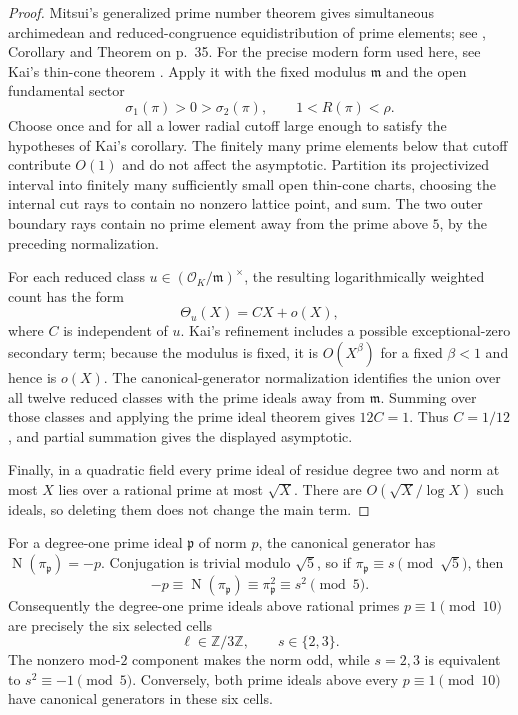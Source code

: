 \documentclass[12pt]{amsart}
\theoremstyle{definition}
\theoremstyle{remark}
\DeclareMathOperator{\N}{N}
\newcommand{\ZZ}{\mathbb{Z}}
\newcommand{\OK}{\mathcal{O}_K}
\begin{document}
\begin{proof}
Mitsui's generalized prime number theorem gives simultaneous
archimedean and reduced-congruence equidistribution of prime elements;
see \cite{jMi56}, Corollary and Theorem on p.~35.  For the precise
modern form used here, see Kai's thin-cone theorem
\cite[Corollary~4.2.3]{oKai22}.  Apply it with the fixed modulus
$\mathfrak m$ and the open fundamental sector
\[
  \sigma_1(\pi)>0>\sigma_2(\pi),
  \qquad 1<R(\pi)<\rho.
\]
Choose once and for all a lower radial cutoff large enough to satisfy
the hypotheses of Kai's corollary.  The finitely many prime elements
below that cutoff contribute $O(1)$ and do not affect the asymptotic.
Partition its projectivized interval into finitely many sufficiently
small open thin-cone charts, choosing the internal cut rays to contain
no nonzero lattice point, and sum.  The two outer boundary rays contain
no prime element away from the prime above $5$, by the preceding
normalization.

For each reduced class $u\in(\OK/\mathfrak m)^\times$, the resulting
logarithmically weighted count has the form
\[
  \Theta_u(X)=C X+o(X),
\]
where $C$ is independent of $u$.  Kai's refinement includes a
possible exceptional-zero secondary term; because the modulus is
fixed, it is $O(X^\beta)$ for a fixed $\beta<1$ and hence is $o(X)$.
The canonical-generator normalization identifies the union over all
twelve reduced classes with the prime ideals away from
$\mathfrak m$.  Summing over those classes and applying the prime
ideal theorem gives $12C=1$.  Thus $C=1/12$, and partial summation
gives the displayed asymptotic.

Finally, in a quadratic field every prime ideal of residue degree two
and norm at most $X$ lies over a rational prime at most $\sqrt X$.
There are $O(\sqrt X/\log X)$ such ideals, so deleting them does not
change the main term.
\end{proof}

For a degree-one prime ideal $\mathfrak p$ of norm $p$, the canonical
generator has $\N(\pi_{\mathfrak p})=-p$.  Conjugation is trivial
modulo $\sqrt5$, so if
$\pi_{\mathfrak p}\equiv s\pmod{\sqrt5}$, then
\[
  -p\equiv\N(\pi_{\mathfrak p})
      \equiv\pi_{\mathfrak p}^{2}
      \equiv s^2\pmod5.
\]
Consequently the degree-one prime ideals above rational primes
$p\equiv1\pmod{10}$ are precisely the six selected cells
\[
  \ell\in\ZZ/3\ZZ,
  \qquad s\in\{2,3\}.
\]
The nonzero mod-$2$ component makes the norm odd, while $s=2,3$ is
equivalent to $s^2\equiv-1\pmod5$.  Conversely, both prime ideals
above every $p\equiv1\pmod{10}$ have canonical generators in these
six cells.
\end{document}

